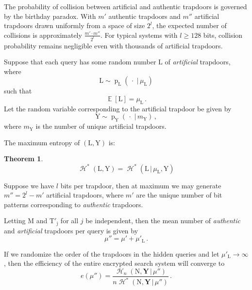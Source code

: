 \documentclass[final,11pt]{article}
\newcommand{\rv}[1]{\mathrm{#1}}
\newcommand{\entropy}{\operatorname{\mathcal{H}}}
\newcommand{\pmf}{\operatorname{p}}
\newcommand{\given}{{\,|\,}}
\renewcommand{\vec}[1]{\boldsymbol{\mathbf{#1}}}
\DeclareMathOperator{\expectation}{\mathbb{E}}
\numberwithin{equation}{section}
\theoremstyle{plain}
\newtheorem{theorem}{Theorem}[section]
\theoremstyle{remark}
\begin{document}
The probability of collision between artificial and authentic trapdoors is governed by the birthday paradox. With $m'$ authentic trapdoors and $m''$ artificial trapdoors drawn uniformly from a space of size $2^l$, the expected number of collisions is approximately $\frac{m' \cdot m''}{2^l}$. For typical systems with $l \geq 128$ bits, collision probability remains negligible even with thousands of artificial trapdoors.

Suppose that each query has some random number $\rv{L}$ of \emph{artificial} trapdoors, where
\begin{equation}
    \rv{L} \sim \pmf_{\rv{L}}(\,\cdot\,\given \mu_{\rv{L}})
\end{equation}
such that
\begin{equation}
    \expectation\!\left[\rv{L}\right] = \mu_{\rv{L}}\,.
\end{equation}
Let the random variable corresponding to the artificial trapdoor be given by
\begin{equation}
    \rv{Y} \sim \pmf_{\rv{Y}}(\,\cdot\,\given m_{\rv{Y}})\,,
\end{equation}
where $m_{\rv{Y}}$ is the number of unique artificial trapdoors.

The maximum entropy of $(\rv{L}, \rv{Y})$ is:
\begin{theorem}
\begin{equation}
    \entropy^*(\rv{L},\rv{Y}) = \entropy^*(\rv{L} \given \mu_{\rv{L}},\rv{Y})
\end{equation}
\end{theorem}

Suppose we have $l$ bits per trapdoor, then at maximum we may generate $m'' = 2^l - m'$ artificial trapdoors, where $m'$ are the unique number of bit patterns corresponding to \emph{authentic} trapdoors. 

Letting $\rv{M}$ and $\rv{T'_j}$ for all $j$ be independent, then the mean number of \emph{authentic} and \emph{artificial} trapdoors per query is given by
\begin{equation}
    \mu'' = \mu' + \mu'_{\rv{L}}\,.
\end{equation}

If we randomize the order of the trapdoors in the hidden queries and let $\mu'_{\rv{L}} \to \infty$, then the efficiency of the entire encrypted search system will converge to
\begin{equation}
    e(\mu'') = \frac
    {
        \entropy_n(\rv{N},\rv{\vec{Y}} \given \mu'')
    }
    {
        n \entropy^*(\rv{N},\rv{\vec{Y}} \given \mu'')
    }\,.
\end{equation}
\end{document}

